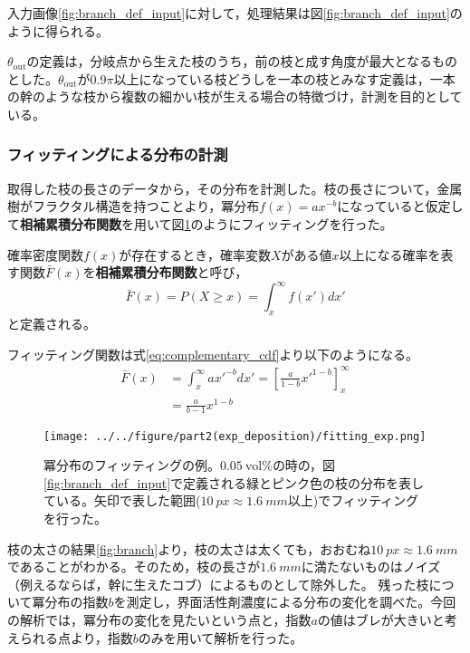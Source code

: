 \documentclass[autodetect-engine,dvi=dvipdfmx,a4paper,ja=standard,oneside,openany,11pt]{bxjsbook}
\begin{document}
入力画像\ref{fig:branch_def_input}に対して，処理結果は図\ref{fig:branch_def_input}のように得られる。

$\theta_{\mathrm{out}}$の定義は，分岐点から生えた枝のうち，前の枝と成す角度が最大となるものとした。$\theta_{\mathrm{out}}$が$0.9\pi$以上になっている枝どうしを一本の枝とみなす定義は，一本の幹のような枝から複数の細かい枝が生える場合の特徴づけ，計測を目的としている。
\subsubsection{フィッティングによる分布の計測}
取得した枝の長さのデータから，その分布を計測した。枝の長さについて，金属樹がフラクタル構造を持つことより，冪分布$f(x)=ax^{-b}$になっていると仮定して\textbf{相補累積分布関数}を用いて図\ref{fig:fitting_exp}のようにフィッティングを行った。

確率密度関数$f(x)$が存在するとき，確率変数$X$がある値$x$以上になる確率を表す関数$\bar{F}(x)$を\textbf{相補累積分布関数}と呼び，
\begin{equation}
  \bar{F}(x) = P(X \geq x) = \int_{x}^{\infty} f(x')dx'
  \label{eq:complementary_cdf}
\end{equation}
と定義される。

フィッティング関数は式\eqref{eq:complementary_cdf}より以下のようになる。
\begin{equation}
  \begin{split}
    \bar{F}(x) & = \int_{x}^{\infty} ax'^{-b}dx' = \left[ \frac{a}{1-b}x'^{1-b} \right]_{x}^{\infty} \\
               & = \frac{a}{b-1}x^{1-b}
  \end{split}
\end{equation}

\begin{figure}[htbp]
  \centering
  \texttt{[image: ../../figure/part2(exp\_deposition)/fitting\_exp.png]}
  \caption{冪分布のフィッティングの例。$\SI{0.05}{\mathrm{vol}\%}$の時の，図\ref{fig:branch_def_input}で定義される緑とピンク色の枝の分布を表している。矢印で表した範囲($\SI{10}{px}\approx\SI{1.6}{mm}$以上)でフィッティングを行った。}
  \label{fig:fitting_exp}
\end{figure}


枝の太さの結果\ref{fig:branch}より，枝の太さは太くても，おおむね$\SI{10}{px}\approx\SI{1.6}{mm}$であることがわかる。そのため，枝の長さが$\SI{1.6}{mm}$に満たないものはノイズ（例えるならば，幹に生えたコブ）によるものとして除外した。
残った枝について冪分布の指数$b$を測定し，界面活性剤濃度による分布の変化を調べた。今回の解析では，冪分布の変化を見たいという点と，指数$a$の値はブレが大きいと考えられる点より，指数$b$のみを用いて解析を行った。

\ifdraft{
  
  
}{}
\end{document}

